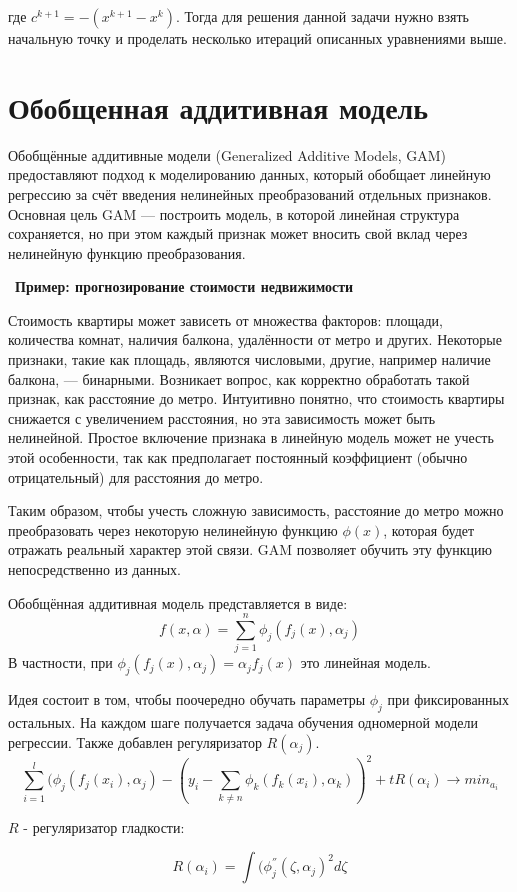 {где \( c^{k + 1} = -(x^{k + 1} - x^{k})\). Тогда для решения данной задачи нужно взять начальную точку и проделать несколько итераций описанных уравнениями выше.

\section{Обобщенная аддитивная модель}

Обобщённые аддитивные модели (Generalized Additive Models, GAM) предоставляют подход к моделированию данных, который обобщает линейную регрессию за счёт введения нелинейных преобразований отдельных признаков. Основная цель GAM — построить модель, в которой линейная структура сохраняется, но при этом каждый признак может вносить свой вклад через нелинейную функцию преобразования.

\
\textbf{Пример: прогнозирование стоимости недвижимости}

Стоимость квартиры может зависеть от множества факторов: площади, количества комнат, наличия балкона, удалённости от метро и других. Некоторые признаки, такие как площадь, являются числовыми, другие, например наличие балкона, — бинарными. Возникает вопрос, как корректно обработать такой признак, как расстояние до метро. Интуитивно понятно, что стоимость квартиры снижается с увеличением расстояния, но эта зависимость может быть нелинейной. Простое включение признака в линейную модель может не учесть этой особенности, так как предполагает постоянный коэффициент (обычно отрицательный) для расстояния до метро.

Таким образом, чтобы учесть сложную зависимость, расстояние до метро можно преобразовать через некоторую нелинейную функцию $\phi(x)$, которая будет отражать реальный характер этой связи. GAM позволяет обучить эту функцию непосредственно из данных.


Обобщённая аддитивная модель представляется в виде:
$$f(x, \alpha) = \sum_{j=1}^{n}\phi_j(f_j(x), \alpha_j)$$
В частности, при $\phi_j(f_j(x), \alpha_j) = \alpha_jf_j(x)$ это линейная модель.

Идея состоит в том, чтобы поочередно обучать параметры $\phi_j$ при фиксированных остальных. На каждом шаге получается задача обучения одномерной модели регрессии. Также добавлен регуляризатор $R(\alpha_j)$.
$$\sum_{i=1}^{l}(\phi_j(f_j(x_i), \alpha_j) - (y_i - \sum_{k \neq n}\phi_k(f_k(x_i), \alpha_k))^2 + tR(\alpha_i) \to min_{a_i}$$

$R$ - регуляризатор гладкости:

$$R(\alpha_i) = \int(\phi_j^{''}(\zeta, \alpha_j)^2d\zeta$$

}

